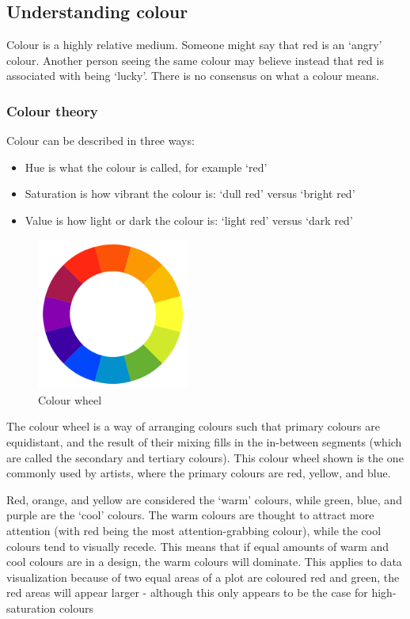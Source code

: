 \documentclass[letterpaper]{article}
\begin{document}
\subsection{Understanding colour}
Colour is a highly relative medium. Someone might say that red is an `angry' colour. Another person seeing the same colour may believe instead that red is associated with being `lucky'. There is no consensus on what a colour means. 

\subsubsection{Colour theory}
Colour can be described in three ways:
\begin{itemize}
\item Hue is what the colour is called, for example `red'
\item Saturation is how vibrant the colour is: `dull red' versus `bright red'
\item Value is how light or dark the colour is: `light red' versus `dark red'
\end{itemize}

\begin{figure}[!ht]
  \begin{center}
     \includegraphics[width=50mm]{Figures/colour_wheel.png}
     \caption{Colour wheel}
  \end{center}
\end{figure}

The colour wheel is a way of arranging colours such that primary colours are equidistant, and the result of their mixing fills in the in-between segments (which are called the secondary and tertiary colours). This colour wheel shown is the one commonly used by artists, where the primary colours are red, yellow, and blue. 

Red, orange, and yellow are considered the `warm' colours, while green, blue, and purple are the `cool' colours. The warm colours are thought to attract more attention (with red being the most attention-grabbing colour), while the cool colours tend to visually recede. This means that if equal amounts of warm and cool colours are in a design, the warm colours will dominate. This applies to data visualization because of two equal areas of a plot are coloured red and green, the red areas will appear larger \cite{tedford} - although this only appears to be the case for high-saturation colours \cite{cleveland-colour-illusion}
\end{document}
